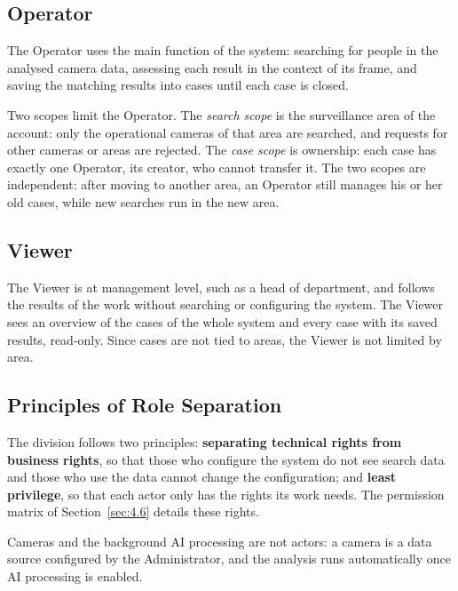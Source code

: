 \subsection{Operator}
\label{sec:4.1.2}

The Operator uses the main function of the system: searching for people in the analysed camera data, assessing each result in the context of its frame, and saving the matching results into cases until each case is closed.

Two scopes limit the Operator. The \emph{search scope} is the surveillance area of the account: only the operational cameras of that area are searched, and requests for other cameras or areas are rejected. The \emph{case scope} is ownership: each case has exactly one Operator, its creator, who cannot transfer it. The two scopes are independent: after moving to another area, an Operator still manages his or her old cases, while new searches run in the new area.

\subsection{Viewer}
\label{sec:4.1.3}

The Viewer is at management level, such as a head of department, and follows the results of the work without searching or configuring the system. The Viewer sees an overview of the cases of the whole system and every case with its saved results, read-only. Since cases are not tied to areas, the Viewer is not limited by area.

\subsection{Principles of Role Separation}
\label{sec:4.1.4}

The division follows two principles: \textbf{separating technical rights from business rights}, so that those who configure the system do not see search data and those who use the data cannot change the configuration; and \textbf{least privilege}, so that each actor only has the rights its work needs. The permission matrix of Section~\ref{sec:4.6} details these rights.

Cameras and the background AI processing are not actors: a camera is a data source configured by the Administrator, and the analysis runs automatically once AI processing is enabled.
